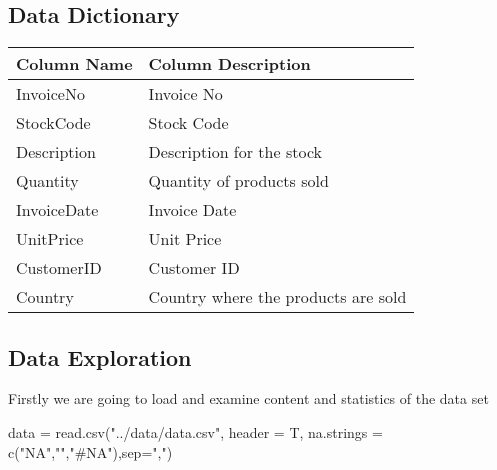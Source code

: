 \hypertarget{data-dictionary}{%
\subsection{Data Dictionary}\label{data-dictionary}}

\begin{longtable}[]{@{}ll@{}}
\toprule
Column Name & Column Description\tabularnewline
\midrule
\endhead
InvoiceNo & Invoice No\tabularnewline
StockCode & Stock Code\tabularnewline
Description & Description for the stock\tabularnewline
Quantity & Quantity of products sold\tabularnewline
InvoiceDate & Invoice Date\tabularnewline
UnitPrice & Unit Price\tabularnewline
CustomerID & Customer ID\tabularnewline
Country & Country where the products are sold\tabularnewline
\bottomrule
\end{longtable}

\hypertarget{data-exploration}{%
\subsection{Data Exploration}\label{data-exploration}}

Firstly we are going to load and examine content and statistics of the
data set

\begin{Schunk}
\begin{Sinput}
data = read.csv("../data/data.csv", header = T, 
                na.strings = c("NA","","#NA"),sep=",")
\end{Sinput}
\end{Schunk}

